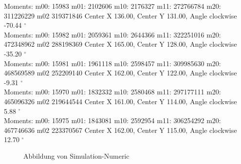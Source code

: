 \documentclass[a4paper]{report}
\begin{document}
\begin{tcolorbox}
{Moments: m00: 15983 m01: 2102606 m10: 2176327 m11: 272766784 m20: 311226229 m02 319371846
Center X 136.00, Center Y 131.00, Angle clockwise -70.44 $^\circ$ \\

Moments: m00: 15982 m01: 2059361 m10: 2644366 m11: 322251016 m20: 472348962 m02 288198369
Center X 165.00, Center Y 128.00, Angle clockwise -35.20 $^\circ$ \\

Moments: m00: 15981 m01: 1961118 m10: 2598457 m11: 309985630 m20: 468569589 m02 252209140
Center X 162.00, Center Y 122.00, Angle clockwise -9.31 $^\circ$ \\

Moments: m00: 15970 m01: 1832332 m10: 2580468 m11: 297177111 m20: 465096326 m02 219644544
Center X 161.00, Center Y 114.00, Angle clockwise 5.88 $^\circ$ \\

Moments: m00: 15975 m01: 1843081 m10: 2592954 m11: 306254292 m20: 467746636 m02 223370567
Center X 162.00, Center Y 115.00, Angle clockwise 12.70 $^\circ$ }

\end{tcolorbox}


\begin{figure}[H]
\centering
{}
\caption{Abbildung von Simulation-Numeric}
\label{fig:Abbildung_von_Simulation_-_Numeric}
\end{figure}
\end{document}
